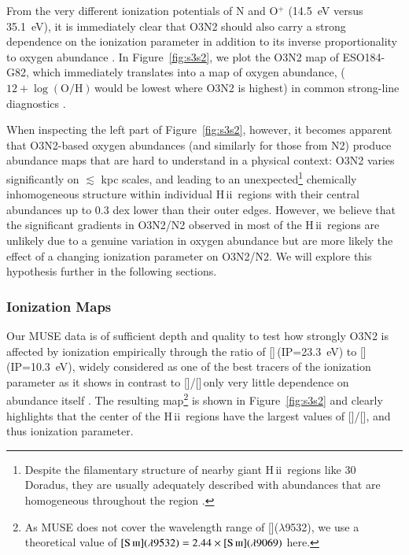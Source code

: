 \documentclass[traditabstract]{aa}
\newcommand{\hii}{\mbox{H\,{\sc ii}}}
\newcommand{\oh}{12+\log(\mathrm{O/H})}
\newcommand{\sii}{[\ion{S}{ii}]}
\newcommand{\siii}{[\ion{S}{iii}]}
\newcommand{\oii}{[\ion{O}{ii}]}
\newcommand{\oiii}{[\ion{O}{iii}]}
\begin{document}
From the very different ionization potentials of N and O$^{+}$ (14.5~eV versus 35.1~eV), it is immediately clear that O3N2 should also carry a strong dependence on the ionization parameter in addition to its inverse proportionality to oxygen abundance \citep[e.g.][]{1979A&A....78..200A, 2015MNRAS.448.2030H}. In Figure~\ref{fig:s3s2}, we plot the O3N2 map of ESO184-G82, which immediately translates into a map of oxygen abundance, ($\oh$\,would be lowest where O3N2 is highest) in common strong-line diagnostics \citep{2004MNRAS.348L..59P}.

When inspecting the left part of Figure~\ref{fig:s3s2}, however, it becomes apparent that O3N2-based oxygen abundances (and similarly for those from N2) produce abundance maps that are hard to understand in a physical context: O3N2 varies significantly on $\lesssim$ kpc scales, and leading to an unexpected\footnote{Despite the filamentary structure of nearby giant \hii~regions like 30 Doradus, they are usually adequately described with abundances that are homogeneous throughout the region \citep[e.g.][and references therein]{2011ApJ...738...34P}.} chemically inhomogeneous structure within individual \hii~regions with their central abundances up to 0.3 dex lower than their outer edges. However, we believe that the significant gradients in O3N2/N2 observed in most of the \hii~regions are unlikely due to a genuine variation in oxygen abundance but are more likely the effect of a changing ionization parameter on O3N2/N2. We will explore this hypothesis further in the following sections.

\subsubsection{Ionization Maps}

Our MUSE data is of sufficient depth and quality to test how strongly O3N2 is affected by ionization empirically through the ratio of \siii\,(IP=23.3~eV) to \sii\,(IP=10.3~eV), widely considered as one of the best tracers of the ionization parameter \citep{1991MNRAS.253..245D} as it shows in contrast to \oiii/\oii\,only very little dependence on abundance itself \citep{2002ApJS..142...35K, 2011MNRAS.415.3616D}. The resulting map\footnote{As MUSE does not cover the wavelength range of \siii($\lambda$9532), we use a theoretical value of $\siii(\lambda9532)=2.44\times\siii(\lambda9069)$ \citep{1982MNRAS.199.1025M} here.} is shown in Figure~\ref{fig:s3s2} and clearly highlights that the center of the \hii~regions have the largest values of \siii/\sii, and thus ionization parameter. 
\end{document}
